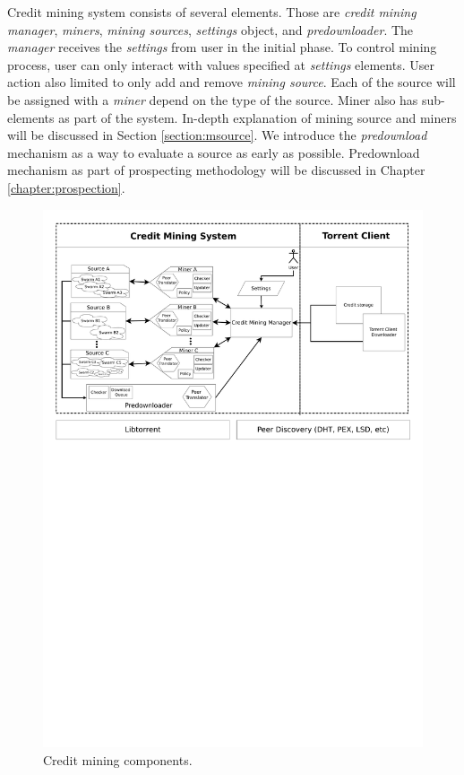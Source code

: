 Credit mining system consists of several elements. Those are \textit{credit mining manager}, \textit{miners}, \textit{mining sources}, \textit{settings} object, and \textit{predownloader}. The \textit{manager} receives the \textit{settings} from user in the initial phase. To control mining process, user can only interact with values specified at \textit{settings} elements. User action also limited to only add and remove \textit{mining source}. Each of the source will be assigned with a \textit{miner} depend on the type of the source. Miner also has sub-elements as part of the system. In-depth explanation of mining source and miners will be discussed in Section \ref{section:msource}. We introduce the \textit{predownload} mechanism as a way to evaluate a source as early as possible. Predownload mechanism as part of prospecting methodology will be discussed in Chapter \ref{chapter:prospection}.

\begin{figure}[ht]
	\centering
 	\includegraphics[width=\textwidth]{pics/cm_components.pdf}
	\caption{Credit mining components.}
	\label{fig:cmcomponents}
\end{figure}

